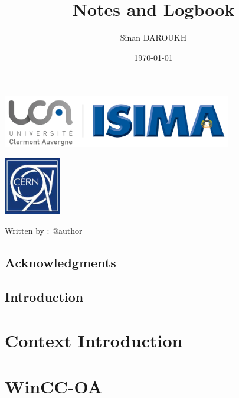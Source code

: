 \documentclass[a4paper, 12pt]{report}
\title{Notes and Logbook}
\author{Sinan DAROUKH}
\date{\today}
\begin{document}
\begin{titlepage}



\enlargethispage{2cm}
\begin{flushleft}
\includegraphics[width=10cm]{CERN/images/ISIMA-logo-carre.jpg}
\end{flushleft}
\begin{flushright}
\includegraphics[width=2.5cm]{CERN/images/CERN-logo.jpg}
\end{flushright}

Written by : @author




\end{titlepage}


\renewcommand{\contentsname}{Table of contents}
\tableofcontents
\newpage
\renewcommand{\listfigurename}{Table of figures and illustrations}
\listoffigures
\newpage


\chapter*{Acknowledgments}

\chapter*{Introduction}


\part{Context Introduction}


\part{WinCC-OA}

\end{document}

